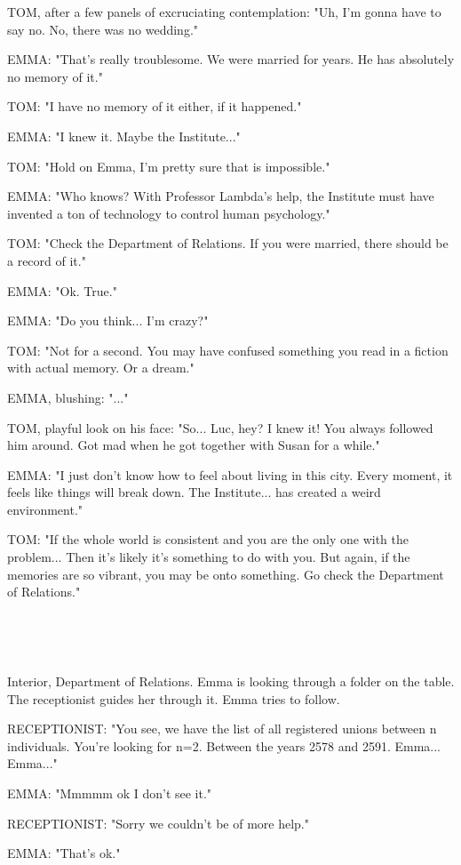 \documentclass[11pt]{article}
\begin{document}
TOM, after a few panels of excruciating contemplation: "Uh, I'm gonna have to say no. No, there was no wedding."

EMMA: "That's really troublesome.
We were married for years. 
He has absolutely no memory of it."

TOM: "I have no memory of it either, if it happened."

EMMA: "I knew it. Maybe the Institute..."

TOM: "Hold on Emma, I'm pretty sure that is impossible."

EMMA: "Who knows? With Professor Lambda's help, the Institute must have invented a ton of technology to control human psychology."

TOM: "Check the Department of Relations. 
If you were married, there should be a record of it."

EMMA: "Ok. True."

EMMA: "Do you think... I'm crazy?"

TOM: "Not for a second. You may have confused something you read in a fiction with actual memory.
Or a dream."

EMMA, blushing: "..."

TOM, playful look on his face: "So... Luc, hey?
I knew it!
You always followed him around.
Got mad when he got together with Susan for a while."

EMMA: "I just don't know how to feel about living in this city.
Every moment, it feels like things will break down.
The Institute... has created a weird environment."

TOM: "If the whole world is consistent and you are the only one with the problem...
Then it's likely it's something to do with you.
But again, if the memories are so vibrant, you may be onto something.
Go check the Department of Relations."

\ 

\ 

Interior, Department of Relations.
Emma is looking through a folder on the table.
The receptionist guides her through it.
Emma tries to follow.

RECEPTIONIST: "You see, we have the list of all registered unions between n individuals. 
You're looking for n=2.
Between the years 2578 and 2591.
Emma...
Emma..."

EMMA: "Mmmmm ok I don't see it."

RECEPTIONIST: "Sorry we couldn't be of more help."

EMMA: "That's ok."
\end{document}
